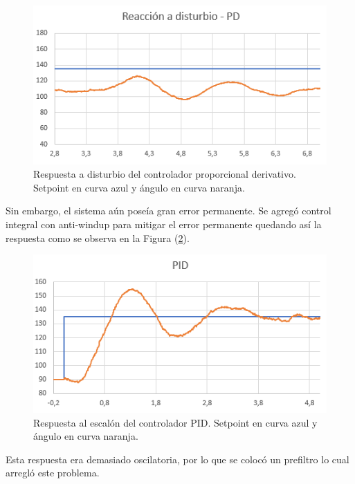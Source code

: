 \begin{figure}[H]
    \centering
    \includegraphics[width=\textwidth]{./Imagenes/kddist.png}
    \caption{Respuesta a disturbio del controlador proporcional derivativo. Setpoint en curva azul y ángulo en curva naranja.}
    \label{fig:kddist}
\end{figure}

Sin embargo, el sistema aún poseía gran error permanente. Se agregó control integral con anti-windup para mitigar el error permanente quedando así la respuesta como se observa en la Figura (\ref{fig:ki}).

\begin{figure}[H]
    \centering
    \includegraphics[width=\textwidth]{./Imagenes/ki.png}
    \caption{Respuesta al escalón del controlador PID. Setpoint en curva azul y ángulo en curva naranja.}
    \label{fig:ki}
\end{figure}

Esta respuesta era demasiado oscilatoria, por lo que se colocó un prefiltro lo cual arregló este problema.

